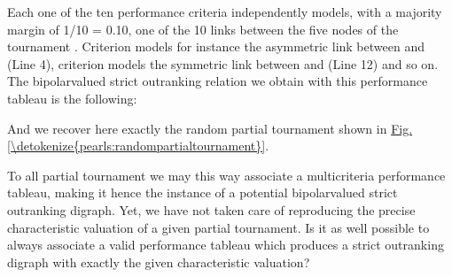 \documentclass[a4paper,12pt,english]{sphinxhowto}
\begin{document}
\sphinxAtStartPar
Each one of the ten performance criteria independently models, with a majority margin of 1/10 = 0.10,  one of the 10 links between the five nodes of the tournament .  Criterion  models for instance the asymmetric link between  and  (Line 4), criterion  models the symmetric link between  and  (Line 12) and so on. The bipolar\sphinxhyphen{}valued strict outranking relation we obtain with this performance tableau is the following:

\begin{sphinxVerbatim}[commandchars=\\\{\},numbers=left,firstnumber=1,stepnumber=1]
\end{sphinxVerbatim}

\sphinxAtStartPar
And we recover here exactly the random partial tournament shown in \hyperref[\detokenize{pearls:randompartialtournament}]{Fig.\@ \ref{\detokenize{pearls:randompartialtournament}}}.

\sphinxAtStartPar
To all partial tournament we may this way associate a multicriteria performance tableau, making it hence the instance of a potential bipolar\sphinxhyphen{}valued strict outranking digraph. Yet, we have not taken care of reproducing the precise characteristic valuation of a given partial tournament. Is it as well possible to always associate a valid performance tableau which produces a strict outranking digraph with exactly the given characteristic valuation?
\end{document}

